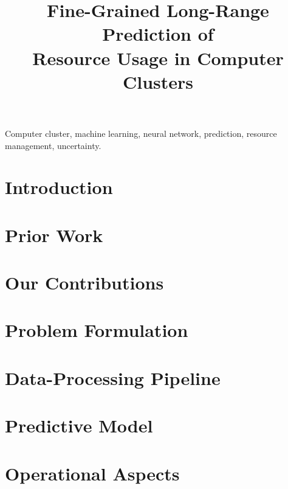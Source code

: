 \documentclass[journal]{IEEEtran}
\title{
  Fine-Grained Long-Range Prediction of\\
  Resource Usage in Computer Clusters
}
\author{}
\begin{document}
  \maketitle

  \begin{abstract}
    
  \end{abstract}

  \begin{IEEEkeywords}
    Computer cluster,
    machine learning,
    neural network,
    prediction,
    resource management,
    uncertainty.
  \end{IEEEkeywords}


  \section{Introduction} 
  

  \section{Prior Work} 
  

  \section{Our Contributions} 
  

  \section{Problem Formulation} 
  

  \section{Data-Processing Pipeline} 
  

  \section{Predictive Model} 
  

  \section{Operational Aspects} 
  
\end{document}
